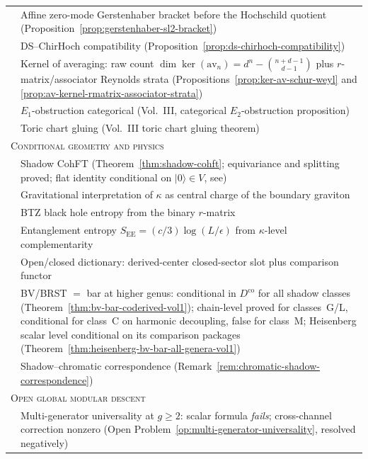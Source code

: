 \begin{center}
\begin{tabular}{cp{10.5cm}}
& Affine zero-mode Gerstenhaber bracket before the Hochschild quotient
 \textup{(}Proposition~\ref{prop:gerstenhaber-sl2-bracket}\textup{)} \\
& DS--ChirHoch compatibility
 \textup{(}Proposition~\ref{prop:ds-chirhoch-compatibility}\textup{)} \\
& Kernel of averaging: raw count $\dim\ker(\mathrm{av}_n)
 = d^n - \binom{n{+}d{-}1}{d{-}1}$
 plus $r$-matrix/associator Reynolds strata
 \textup{(}Propositions~\ref{prop:ker-av-schur-weyl} and
 \ref{prop:av-kernel-rmatrix-associator-strata}\textup{)} \\
& $E_1$-obstruction categorical
 \textup{(}Vol.~III, categorical $E_2$-obstruction proposition\textup{)} \\
& Toric chart gluing
 \textup{(}Vol.~III toric chart gluing theorem\textup{)} \\[4pt]
\multicolumn{2}{l}{\textsc{Conditional geometry and physics}} \\[2pt]
& Shadow CohFT
 \textup{(}Theorem~\ref{thm:shadow-cohft};
 equivariance and splitting proved;
 flat identity conditional on $|0\rangle \in V$,
 see\textup{)} \\
& Gravitational interpretation of $\kappa$
 as central charge of the boundary graviton \\
& BTZ black hole entropy from the binary $r$-matrix \\
& Entanglement entropy $S_{\mathrm{EE}} = (c/3)\log(L/\epsilon)$
 from $\kappa$-level complementarity \\
& Open/closed dictionary:
 derived-center closed-sector slot plus comparison functor \\
& BV/BRST $=$ bar at higher genus:
 conditional in $D^{\mathrm{co}}$ for all shadow classes
 \textup{(}Theorem~\ref{thm:bv-bar-coderived-vol1}\textup{)};
 chain-level proved for classes~G/L, conditional for class~C on
 harmonic decoupling, false for class~M;
 Heisenberg scalar level conditional on its comparison packages
 \textup{(}Theorem~\ref{thm:heisenberg-bv-bar-all-genera-vol1}\textup{)} \\
& Shadow--chromatic correspondence
 \textup{(}Remark~\ref{rem:chromatic-shadow-correspondence}\textup{)} \\[4pt]
\multicolumn{2}{l}{\textsc{Open global modular descent}} \\[2pt]
& Multi-generator universality at $g \geq 2$:
 scalar formula \emph{fails}; cross-channel correction nonzero
 \textup{(}Open Problem~\ref{op:multi-generator-universality},
 resolved negatively\textup{)} \\

\end{tabular}
\end{center}
